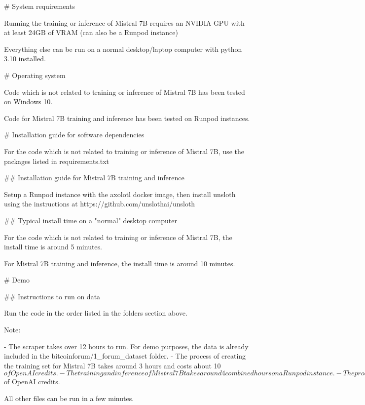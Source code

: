 # System requirements

Running the training or inference of Mistral 7B requires an NVIDIA GPU with at least 24GB of VRAM (can also be a Runpod instance)

Everything else can be run on a normal desktop/laptop computer with python 3.10 installed.

# Operating system

Code which is not related to training or inference of Mistral 7B has been tested on Windows 10.

Code for Mistral 7B training and inference has been tested on Runpod instances.

# Installation guide for software dependencies

For the code which is not related to training or inference of Mistral 7B, use the packages listed in requirements.txt

## Installation guide for Mistral 7B training and inference

Setup a Runpod instance with the axolotl docker image, then install unsloth using the instructions at https://github.com/unslothai/unsloth

## Typical install time on a "normal" desktop computer

For the code which is not related to training or inference of Mistral 7B, the install time is around 5 minutes.

For Mistral 7B training and inference, the install time is around 10 minutes.

# Demo

## Instructions to run on data

Run the code in the order listed in the folders section above.

Note:

- The scraper takes over 12 hours to run. For demo purposes, the data is already included in the bitcoinforum/1_forum_dataset folder.
- The process of creating the training set for Mistral 7B takes around 3 hours and costs about 10$ of OpenAI credits.
- The training and inference of Mistral 7B takes around 4 combined hours on a Runpod instance.
- The process of mapping the hardware names to those of the efficiency table takes around 3 hour and also costs about 10$ of OpenAI credits.

All other files can be run in a few minutes.